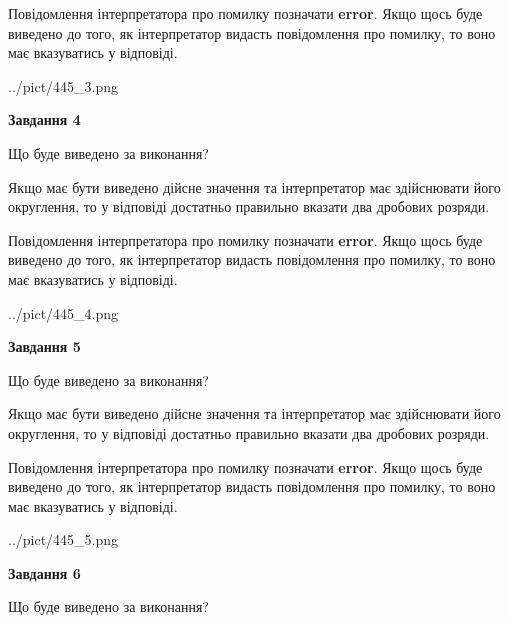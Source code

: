 \documentclass[12pt, ukrainian]{article}
\begin{document}
{\begin {Large}
Повідомлення інтерпретатора про помилку позначати \textbf{error}.
Якщо щось буде виведено до того, як інтерпретатор видасть повідомлення про помилку, 
то воно має вказуватись у відповіді. \par

\begin{center}
	{../pict/445_3.png}
\end{center}
\newpage

{\begin {center}\textbf{Завдання 4}\end {center}}\par
Що буде виведено за виконання? \par

Якщо має бути виведено дійсне значення та інтерпретатор має здійснювати його округлення, 
то у відповіді достатньо правильно вказати два дробових розряди.

Повідомлення інтерпретатора про помилку позначати \textbf{error}.
Якщо щось буде виведено до того, як інтерпретатор видасть повідомлення про помилку, 
то воно має вказуватись у відповіді. \par

\begin{center}
	{../pict/445_4.png}
\end{center}
\newpage

{\begin {center}\textbf{Завдання 5}\end {center}}\par
Що буде виведено за виконання? \par

Якщо має бути виведено дійсне значення та інтерпретатор має здійснювати його округлення, 
то у відповіді достатньо правильно вказати два дробових розряди.

Повідомлення інтерпретатора про помилку позначати \textbf{error}.
Якщо щось буде виведено до того, як інтерпретатор видасть повідомлення про помилку, 
то воно має вказуватись у відповіді. \par

\begin{center}
	{../pict/445_5.png}
\end{center}
\newpage

{\begin {center}\textbf{Завдання 6}\end {center}}\par
Що буде виведено за виконання? \par


\end{Large}}
\end{document}
